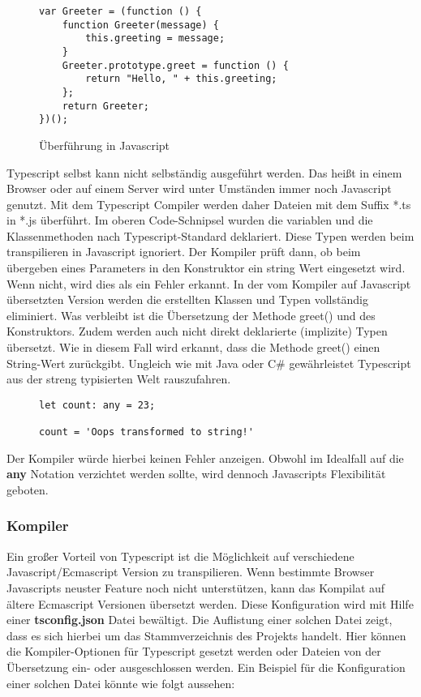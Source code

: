 \begin{figure}[H]
\begin{lstlisting}[basicstyle=\small]
var Greeter = (function () {
    function Greeter(message) {
        this.greeting = message;
    }
    Greeter.prototype.greet = function () {
        return "Hello, " + this.greeting;
    };
    return Greeter;
})(); 
\end{lstlisting}
\caption{Überführung in Javascript \cite{typescript-example}}
\end{figure}

\noindent
Typescript selbst kann nicht selbständig ausgeführt werden. Das heißt in einem Browser oder auf einem Server wird unter Umständen immer noch Javascript genutzt. Mit dem Typescript Compiler werden daher Dateien mit dem Suffix *.ts in *.js überführt. Im oberen Code-Schnipsel wurden die variablen und die Klassenmethoden nach Typescript-Standard deklariert. Diese Typen werden beim transpilieren in Javascript ignoriert. Der Kompiler prüft dann, ob beim übergeben eines Parameters in den Konstruktor ein string Wert eingesetzt wird. Wenn nicht, wird dies als ein Fehler erkannt. In der vom Kompiler auf Javascript übersetzten Version werden die erstellten Klassen und Typen vollständig eliminiert. Was verbleibt ist die Übersetzung der Methode greet() und des Konstruktors. Zudem werden auch nicht direkt deklarierte (implizite) Typen übersetzt. Wie in diesem Fall wird erkannt, dass die Methode greet() einen String-Wert zurückgibt. Ungleich wie mit Java oder C\# gewährleistet Typescript aus der streng typisierten Welt rauszufahren.

\begin{figure}[H]
\begin{lstlisting}[basicstyle=\small]
let count: any = 23;

count = 'Oops transformed to string!'
\end{lstlisting}
\end{figure}

\noindent
Der Kompiler würde hierbei keinen Fehler anzeigen. Obwohl im Idealfall auf die \textbf{any} Notation verzichtet werden sollte, wird dennoch Javascripts Flexibilität geboten. 

\subsubsection{Kompiler}
Ein großer Vorteil von Typescript ist die Möglichkeit auf verschiedene Javascript/Ecmascript Version zu transpilieren. Wenn bestimmte Browser Javascripts neuster Feature noch nicht unterstützen, kann das Kompilat auf ältere Ecmascript Versionen übersetzt werden. Diese Konfiguration wird mit Hilfe einer \textbf{tsconfig.json} Datei bewältigt. Die Auflistung einer solchen Datei zeigt, dass es sich hierbei um das Stammverzeichnis des Projekts handelt. Hier können die Kompiler-Optionen für Typescript gesetzt werden oder Dateien von der Übersetzung ein- oder ausgeschlossen werden. Ein Beispiel für die Konfiguration einer solchen Datei könnte wie folgt aussehen: 

